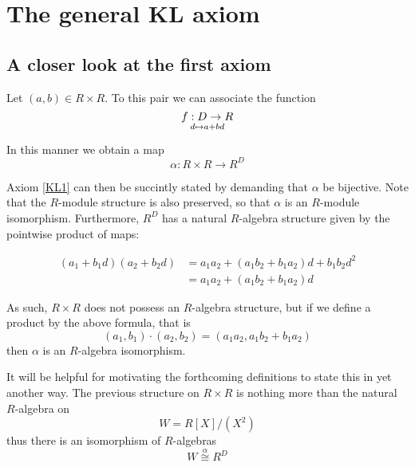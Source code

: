 \documentclass[11pt]{article}
\theoremstyle{definition}
\newcommand{\quot}[2]{#1/#2} %
\numberwithin{equation}{section}
\begin{document}
\section{The general KL axiom}

\subsection{A closer look at the first axiom} \label{ax1re}

Let \( (a,b)\in R\times R \). To this pair we can associate the function
\begin{equation*}
  f:D\to R
  \atop
  d\mapsto a + bd
\end{equation*}

In this manner we obtain a map
\begin{equation*}
  \alpha : R\times R\to R^D
\end{equation*}

Axiom \ref{KL1} can then be succintly stated by demanding that \( \alpha \) be bijective. Note that the \( R \)-module structure is also preserved, so that \( \alpha \) is an \( R \)-module isomorphism. Furthermore, \( R^D \) has a natural \( R \)-algebra structure given by the pointwise product of maps:

\begin{align}
  (a_1 + b_1d)(a_2 + b_2d) & = a_1a_2 + (a_1b_2 + b_1a_2)d + b_1b_2d^2 \\
                           & = a_1a_2 + (a_1b_2 + b_1a_2)d
  \label{R-alg}
\end{align}

As such, \( R\times R \) does not possess an \( R \)-algebra structure, but if we define a product by the above formula, that is
\begin{equation*}
  (a_1,b_1)\cdot(a_2,b_2) = (a_1a_2,a_1b_2 + b_1a_2)
\end{equation*}
then \( \alpha  \) is an \( R \)-algebra isomorphism.

It will be helpful for motivating the forthcoming definitions to state this in yet another way. The previous structure on \( R\times R \) is nothing more than the natural \( R \)-algebra on
\begin{equation*}
  W = \quot{R[X]}{(X^2)}
\end{equation*}
thus there is an isomorphism of \( R \)-algebras
\begin{equation*}
  W \stackrel{\alpha}{\cong} R^D
\end{equation*}
\end{document}
